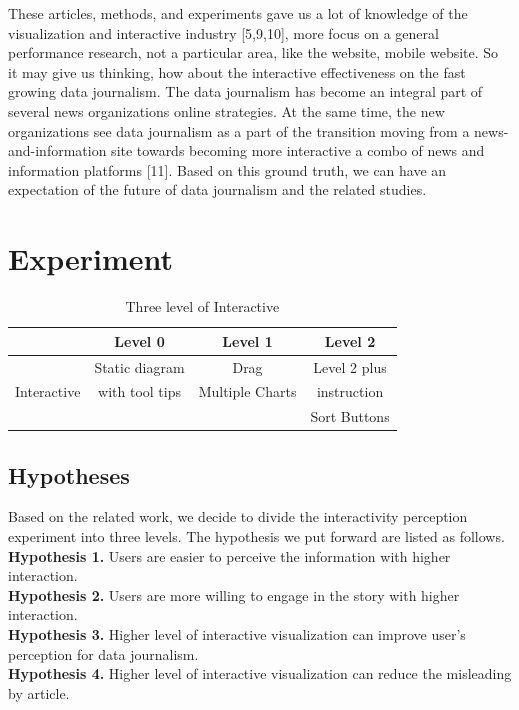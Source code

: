 \documentclass[9pt,journal,compsoc]{IEEEtran}
\begin{document}
These articles, methods, and experiments gave us a lot of knowledge of the visualization and interactive industry [5,9,10],  more focus on a general performance research, not a particular area, like the website, mobile website. So it may give us thinking, how about the interactive effectiveness on the fast growing data journalism. The data journalism has become an integral part of several news organizations online strategies. At the same time, the new organizations see data journalism as a part of the transition moving from a news-and-information site towards becoming more interactive a combo of news and information platforms [11]. Based on this ground truth, we can have an expectation of the future of data journalism and the related studies.   

\section{Experiment}
\large
\begin{table}
	\centering
		\begin{tabular}{|c|c|c|c|}
		\hline
     	&Level 0&Level 1&Level 2\\
     	\hline
            		&Static diagram&Drag & Level 2 plus\\ 
        Interactive& with tool tips&Multiple Charts& instruction\\
					&             &   			&Sort Buttons\\
     	\hline
        \end{tabular}
     \caption{Three level of Interactive}
\end{table}
\subsection{Hypotheses}
Based on the related work, we decide to divide the interactivity perception experiment into three levels. The hypothesis we put forward are listed as follows.\\
\textbf{Hypothesis 1.} Users are easier to perceive the information with higher interaction.\\
\textbf{Hypothesis 2.} Users are more willing to engage in the story with higher interaction.\\
\textbf{Hypothesis 3.} Higher level of interactive visualization can improve user's perception for data journalism.\\
\textbf{Hypothesis 4.} Higher level of interactive visualization can reduce the misleading by article.\\
\end{document}
